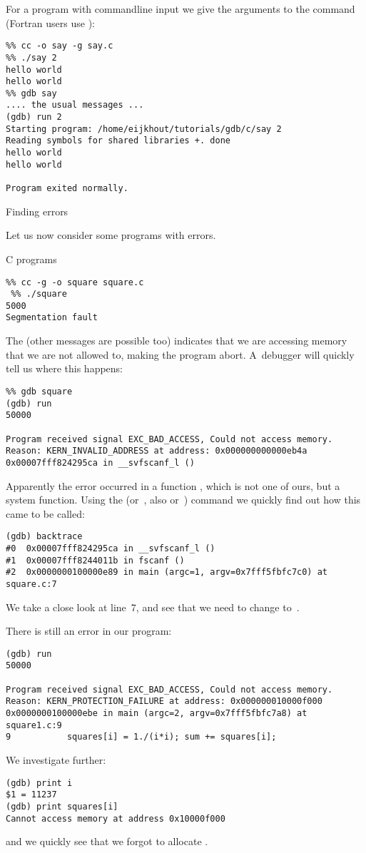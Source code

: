 For a program with commandline input we give the arguments to the
 command (Fortran users use ):
\begin{verbatim}
%% cc -o say -g say.c
%% ./say 2
hello world
hello world
%% gdb say
.... the usual messages ...
(gdb) run 2
Starting program: /home/eijkhout/tutorials/gdb/c/say 2
Reading symbols for shared libraries +. done
hello world
hello world

Program exited normally.
\end{verbatim}

 {Finding errors}

Let us now consider some programs with errors.

 {C programs}

\begin{verbatim}
%% cc -g -o square square.c
 %% ./square
5000
Segmentation fault
\end{verbatim}
The  (other messages are possible too) 
indicates that we are accessing
memory that we are not allowed to, making the program
abort. A~debugger will quickly tell us where this happens:
\begin{verbatim}
%% gdb square
(gdb) run
50000

Program received signal EXC_BAD_ACCESS, Could not access memory.
Reason: KERN_INVALID_ADDRESS at address: 0x000000000000eb4a
0x00007fff824295ca in __svfscanf_l ()
\end{verbatim}
Apparently the error occurred in a function , which is
not one of ours, but a system function. Using the 
(or~, also  or~) command we quickly find out how
this came to be called:
\begin{verbatim}
(gdb) backtrace
#0  0x00007fff824295ca in __svfscanf_l ()
#1  0x00007fff8244011b in fscanf ()
#2  0x0000000100000e89 in main (argc=1, argv=0x7fff5fbfc7c0) at square.c:7
\end{verbatim}
We take a close look at line~7, and see that we need to
change  to~.

There is still an error in our program:
\begin{verbatim}
(gdb) run
50000

Program received signal EXC_BAD_ACCESS, Could not access memory.
Reason: KERN_PROTECTION_FAILURE at address: 0x000000010000f000
0x0000000100000ebe in main (argc=2, argv=0x7fff5fbfc7a8) at square1.c:9
9           squares[i] = 1./(i*i); sum += squares[i];
\end{verbatim}
We investigate further:
\begin{verbatim}
(gdb) print i
$1 = 11237
(gdb) print squares[i]
Cannot access memory at address 0x10000f000
\end{verbatim}
and we quickly see that we forgot to allocate .

